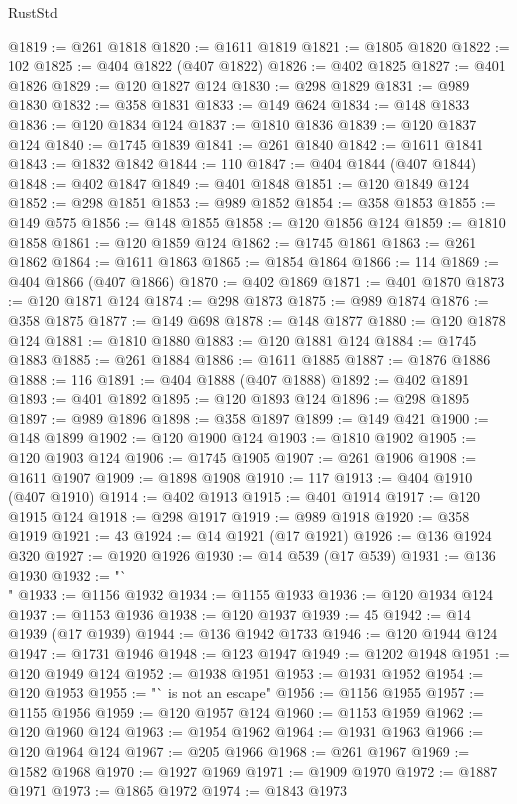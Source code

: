 \begin{lexlean}{RustStd}
\begin{coremodule}
@1819 := @261 @1818
@1820 := @1611 @1819
@1821 := @1805 @1820
@1822 := 102
@1825 := @404 @1822 (@407 @1822)
@1826 := @402 @1825
@1827 := @401 @1826
@1829 := @120 @1827 @124
@1830 := @298 @1829
@1831 := @989 @1830
@1832 := @358 @1831
@1833 := @149 @624
@1834 := @148 @1833
@1836 := @120 @1834 @124
@1837 := @1810 @1836
@1839 := @120 @1837 @124
@1840 := @1745 @1839
@1841 := @261 @1840
@1842 := @1611 @1841
@1843 := @1832 @1842
@1844 := 110
@1847 := @404 @1844 (@407 @1844)
@1848 := @402 @1847
@1849 := @401 @1848
@1851 := @120 @1849 @124
@1852 := @298 @1851
@1853 := @989 @1852
@1854 := @358 @1853
@1855 := @149 @575
@1856 := @148 @1855
@1858 := @120 @1856 @124
@1859 := @1810 @1858
@1861 := @120 @1859 @124
@1862 := @1745 @1861
@1863 := @261 @1862
@1864 := @1611 @1863
@1865 := @1854 @1864
@1866 := 114
@1869 := @404 @1866 (@407 @1866)
@1870 := @402 @1869
@1871 := @401 @1870
@1873 := @120 @1871 @124
@1874 := @298 @1873
@1875 := @989 @1874
@1876 := @358 @1875
@1877 := @149 @698
@1878 := @148 @1877
@1880 := @120 @1878 @124
@1881 := @1810 @1880
@1883 := @120 @1881 @124
@1884 := @1745 @1883
@1885 := @261 @1884
@1886 := @1611 @1885
@1887 := @1876 @1886
@1888 := 116
@1891 := @404 @1888 (@407 @1888)
@1892 := @402 @1891
@1893 := @401 @1892
@1895 := @120 @1893 @124
@1896 := @298 @1895
@1897 := @989 @1896
@1898 := @358 @1897
@1899 := @149 @421
@1900 := @148 @1899
@1902 := @120 @1900 @124
@1903 := @1810 @1902
@1905 := @120 @1903 @124
@1906 := @1745 @1905
@1907 := @261 @1906
@1908 := @1611 @1907
@1909 := @1898 @1908
@1910 := 117
@1913 := @404 @1910 (@407 @1910)
@1914 := @402 @1913
@1915 := @401 @1914
@1917 := @120 @1915 @124
@1918 := @298 @1917
@1919 := @989 @1918
@1920 := @358 @1919
@1921 := 43
@1924 := @14 @1921 (@17 @1921)
@1926 := @136 @1924 @320
@1927 := @1920 @1926
@1930 := @14 @539 (@17 @539)
@1931 := @136 @1930
@1932 := "`\\"
@1933 := @1156 @1932
@1934 := @1155 @1933
@1936 := @120 @1934 @124
@1937 := @1153 @1936
@1938 := @120 @1937
@1939 := 45
@1942 := @14 @1939 (@17 @1939)
@1944 := @136 @1942 @1733
@1946 := @120 @1944 @124
@1947 := @1731 @1946
@1948 := @123 @1947
@1949 := @1202 @1948
@1951 := @120 @1949 @124
@1952 := @1938 @1951
@1953 := @1931 @1952
@1954 := @120 @1953
@1955 := "` is not an escape"
@1956 := @1156 @1955
@1957 := @1155 @1956
@1959 := @120 @1957 @124
@1960 := @1153 @1959
@1962 := @120 @1960 @124
@1963 := @1954 @1962
@1964 := @1931 @1963
@1966 := @120 @1964 @124
@1967 := @205 @1966
@1968 := @261 @1967
@1969 := @1582 @1968
@1970 := @1927 @1969
@1971 := @1909 @1970
@1972 := @1887 @1971
@1973 := @1865 @1972
@1974 := @1843 @1973

\end{coremodule}
\end{lexlean}

